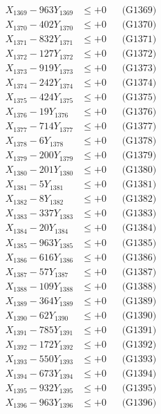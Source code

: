 \documentclass[a4paper,10pt]{article}
\begin{document}
{\begin{align}
X_{1369} - 963Y_{1369} &\leq +0 && \text{(G1369)} \\
X_{1370} - 402Y_{1370} &\leq +0 && \text{(G1370)} \\
\allowbreak
X_{1371} - 832Y_{1371} &\leq +0 && \text{(G1371)} \\
X_{1372} - 127Y_{1372} &\leq +0 && \text{(G1372)} \\
X_{1373} - 919Y_{1373} &\leq +0 && \text{(G1373)} \\
X_{1374} - 242Y_{1374} &\leq +0 && \text{(G1374)} \\
X_{1375} - 424Y_{1375} &\leq +0 && \text{(G1375)} \\
X_{1376} - 19Y_{1376} &\leq +0 && \text{(G1376)} \\
X_{1377} - 714Y_{1377} &\leq +0 && \text{(G1377)} \\
X_{1378} - 6Y_{1378} &\leq +0 && \text{(G1378)} \\
X_{1379} - 200Y_{1379} &\leq +0 && \text{(G1379)} \\
X_{1380} - 201Y_{1380} &\leq +0 && \text{(G1380)} \\
\allowbreak
X_{1381} - 5Y_{1381} &\leq +0 && \text{(G1381)} \\
X_{1382} - 8Y_{1382} &\leq +0 && \text{(G1382)} \\
X_{1383} - 337Y_{1383} &\leq +0 && \text{(G1383)} \\
X_{1384} - 20Y_{1384} &\leq +0 && \text{(G1384)} \\
X_{1385} - 963Y_{1385} &\leq +0 && \text{(G1385)} \\
X_{1386} - 616Y_{1386} &\leq +0 && \text{(G1386)} \\
X_{1387} - 57Y_{1387} &\leq +0 && \text{(G1387)} \\
X_{1388} - 109Y_{1388} &\leq +0 && \text{(G1388)} \\
X_{1389} - 364Y_{1389} &\leq +0 && \text{(G1389)} \\
X_{1390} - 62Y_{1390} &\leq +0 && \text{(G1390)} \\
\allowbreak
X_{1391} - 785Y_{1391} &\leq +0 && \text{(G1391)} \\
X_{1392} - 172Y_{1392} &\leq +0 && \text{(G1392)} \\
X_{1393} - 550Y_{1393} &\leq +0 && \text{(G1393)} \\
X_{1394} - 673Y_{1394} &\leq +0 && \text{(G1394)} \\
X_{1395} - 932Y_{1395} &\leq +0 && \text{(G1395)} \\
X_{1396} - 963Y_{1396} &\leq +0 && \text{(G1396)} \\

\end{align}}
\end{document}
